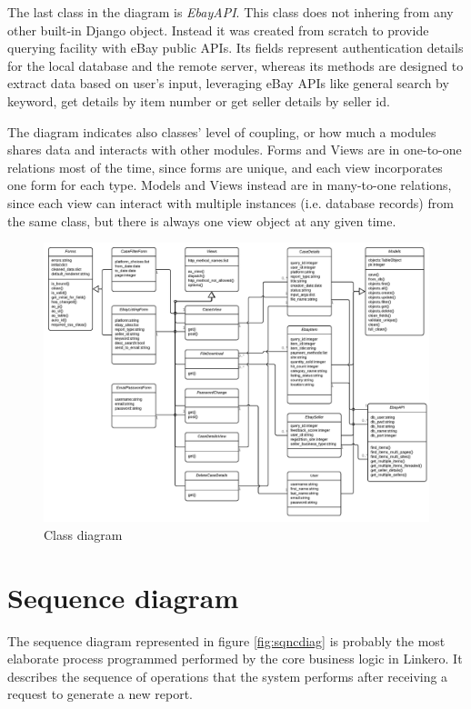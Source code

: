 The last class in the diagram is \emph{EbayAPI}. This class does not inhering
from any other built-in Django object. Instead it was created from scratch to
provide querying facility with eBay public APIs. Its fields represent
authentication details for the local database and the remote server, whereas its
methods are designed to extract data based on user's input, leveraging eBay
APIs like general search by keyword, get details by item number or get seller
details by seller id.

The diagram indicates also classes' level of coupling, or how much a modules
shares data and interacts with other modules. Forms and Views are in one-to-one
relations most of the time, since forms are unique, and each view incorporates
one form for each type. Models and Views instead are in many-to-one relations,
since each view can interact with multiple instances (i.e. database records)
from the same class, but there is always one view object at any given time.

\begin{figure}[H]
\centering
\includegraphics[angle=90, scale=0.9]{imgs/ClassDiag.pdf}
\caption{Class diagram}
\label{fig:clssdiag}
\end{figure}

\section{Sequence diagram}
The sequence diagram represented in figure \ref{fig:sqncdiag} is probably the
most elaborate process programmed performed by the core business logic
in Linkero. It describes the sequence of operations that the system performs
after receiving a request to generate a new report.

